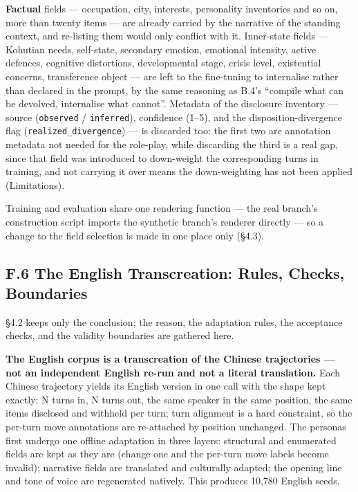 \documentclass[letterpaper]{article}
\begin{document}
\textbf{Factual} fields --- occupation, city, interests, personality inventories and so on, more than twenty items --- are already carried by the narrative of the standing context, and re-listing them would only conflict with it. Inner-state fields --- Kohutian needs, self-state, secondary emotion, emotional intensity, active defences, cognitive distortions, developmental stage, crisis level, existential concerns, transference object --- are left to the fine-tuning to internalise rather than declared in the prompt, by the same reasoning as B.4's ``compile what can be devolved, internalise what cannot''. Metadata of the disclosure inventory --- source (\texttt{observed} / \texttt{inferred}), confidence (1--5), and the disposition-divergence flag (\texttt{realized\_divergence}) --- is discarded too: the first two are annotation metadata not needed for the role-play, while discarding the third is a real gap, since that field was introduced to down-weight the corresponding turns in training, and not carrying it over means the down-weighting has not been applied (Limitations).

Training and evaluation share one rendering function --- the real branch's construction script imports the synthetic branch's renderer directly --- so a change to the field selection is made in one place only (\S{}4.3).


\subsection*{F.6 The English Transcreation: Rules, Checks, Boundaries}

\S{}4.2 keeps only the conclusion; the reason, the adaptation rules, the acceptance checks, and the validity boundaries are gathered here.

\textbf{The English corpus is a transcreation of the Chinese trajectories --- not an independent English re-run and not a literal translation.} Each Chinese trajectory yields its English version in one call with the shape kept exactly: N turns in, N turns out, the same speaker in the same position, the same items disclosed and withheld per turn; turn alignment is a hard constraint, so the per-turn move annotations are re-attached by position unchanged. The personas first undergo one offline adaptation in three layers: structural and enumerated fields are kept as they are (change one and the per-turn move labels become invalid); narrative fields are translated and culturally adapted; the opening line and tone of voice are regenerated natively. This produces 10,780 English seeds.
\end{document}
